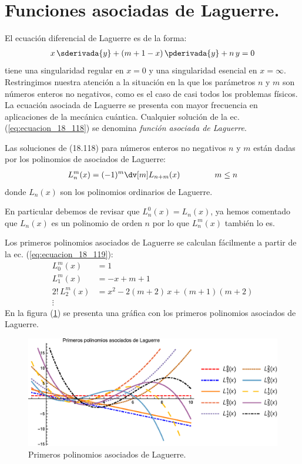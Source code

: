 \section{Funciones asociadas de Laguerre.}

El ecuación diferencial de Laguerre es de la forma:
\begin{align}
x \, \sderivada{y} + (m +  1 - x) \, \pderivada{y} + n \, y = 0
\label{eq:ecuacion_18_118}
\end{align}
tiene una singularidad regular en $x = 0$ y una singularidad esencial en $x = \infty$. Restringimos nuestra atención a la situación en la que los parámetros $n$ y $m$ son números enteros no negativos, como es el caso de casi todos los problemas físicos. La ecuación asociada de Laguerre se presenta con mayor frecuencia en aplicaciones de la mecánica cuántica. Cualquier solución de la ec. (\ref{eq:ecuacion_18_118}) se denomina \emph{función asociada de Laguerre}.
\par
Las soluciones de (18.118) para números enteros no negativos $n$ y $m$ están dadas por los polinomios de asociados de Laguerre:
\begin{align}
L_{n}^{m} (x) = (-1)^{m} \dv[m] L_{n+m} (x) \hspace{1.5cm} m \leq n
\label{eq:ecuacion_18_119}
\end{align}
donde $L_{n}(x)$ son los polinomios ordinarios de Laguerre.
\par
En particular debemos de revisar que $L_{n}^{0} (x) = L_{n}(x)$, ya hemos comentado que $L_{n}(x)$ es un polinomio de orden $n$ por lo que $L_{n}^{m} (x)$ también lo es.
\par
Los primeros polinomios asociados de Laguerre se calculan fácilmente a partir de la ec. (\ref{eq:ecuacion_18_119}):
\begin{align*}
L_{0}^{m} (x) &= 1 \\[0.5em]
L_{1}^{m} (x) &= -x + m + 1 \\[0.5em]
2! \, L_{2}^{m} (x) &= x^{2} - 2 (m + 2) \, x + (m + 1)(m + 2) \\[0.5em]
\vdots
\end{align*}
En la figura (\ref{fig:grafica_Laguerre_02}) se presenta una gráfica con los primeros polinomios asociados de Laguerre.
\begin{figure}[H]
    \centering
    \includegraphics[scale=1]{Imagenes/Polinomios_Laguerre_04.eps}
    \caption{Primeros polinomios asociados de Laguerre.}
    \label{fig:grafica_Laguerre_02}
\end{figure}
